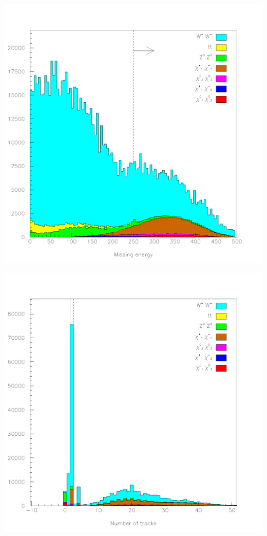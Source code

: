 \documentclass[landscape]{article}
\begin{document}
\huge
\renewcommand{\labelitemi}{-}
\setlength{\parindent}{0 cm}

\begin{center} \includegraphics[height=\textheight]{pretty_1.pdf} \end{center}
\pagebreak

\begin{center} \includegraphics[height=\textheight]{pretty_2.pdf} \end{center}
\pagebreak
\end{document}
